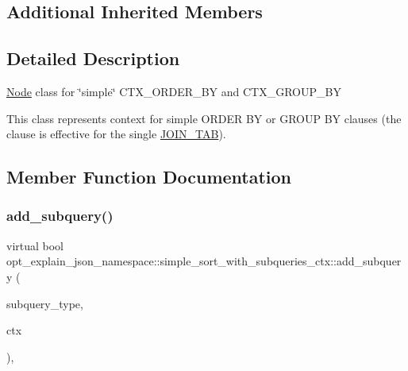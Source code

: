\subsection*{Additional Inherited Members}


\subsection{Detailed Description}
\mbox{\hyperlink{classNode}{Node}} class for \char`\"{}simple\char`\"{} C\+T\+X\+\_\+\+O\+R\+D\+E\+R\+\_\+\+BY and C\+T\+X\+\_\+\+G\+R\+O\+U\+P\+\_\+\+BY

This class represents context for simple O\+R\+D\+ER BY or G\+R\+O\+UP BY clauses (the clause is effective for the single \mbox{\hyperlink{classJOIN__TAB}{J\+O\+I\+N\+\_\+\+T\+AB}}). 

\subsection{Member Function Documentation}
\mbox{\label{classopt__explain__json__namespace_1_1simple__sort__with__subqueries__ctx_a52373af3d533ac538155d1c4af9e8163}} 
\subsubsection{\texorpdfstring{add\+\_\+subquery()}{add\_subquery()}}
{\footnotesize\ttfamily virtual bool opt\+\_\+explain\+\_\+json\+\_\+namespace\+::simple\+\_\+sort\+\_\+with\+\_\+subqueries\+\_\+ctx\+::add\+\_\+subquery (\begin{DoxyParamCaption}\item[{subquery\+\_\+list\+\_\+enum}]{subquery\+\_\+type,  }\item[{\mbox{\hyperlink{classopt__explain__json__namespace_1_1subquery__ctx}{subquery\+\_\+ctx}} $\ast$}]{ctx }\end{DoxyParamCaption})\hspace{0.3cm}{\ttfamily [inline]}, {\ttfamily [virtual]}}

